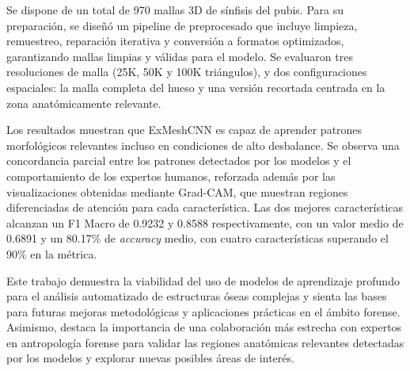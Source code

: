 Se dispone de un total de 970 mallas 3D de sínfisis del pubis. Para su preparación, se diseñó un pipeline de preprocesado que incluye limpieza, remuestreo, reparación iterativa y conversión a formatos optimizados, garantizando mallas limpias y válidas para el modelo. Se evaluaron tres resoluciones de malla (25K, 50K y 100K triángulos), y dos configuraciones espaciales: la malla completa del hueso y una versión recortada centrada en la zona anatómicamente relevante.

Los resultados muestran que ExMeshCNN es capaz de aprender patrones morfológicos relevantes incluso en condiciones de alto desbalance. Se observa una concordancia parcial entre los patrones detectados por los modelos y el comportamiento de los expertos humanos, reforzada además por las visualizaciones obtenidas mediante Grad-CAM, que muestran regiones diferenciadas de atención para cada característica. Las dos mejores características alcanzan un F1 Macro de 0.9232 y 0.8588 respectivamente, con un valor medio de 0.6891 y un 80.17\% de \textit{accuracy} medio, con cuatro características superando el 90\% en la métrica.

Este trabajo demuestra la viabilidad del uso de modelos de aprendizaje profundo para el análisis automatizado de estructuras óseas complejas y sienta las bases para futuras mejoras metodológicas y aplicaciones prácticas en el ámbito forense. Asimismo, destaca la importancia de una colaboración más estrecha con expertos en antropología forense para validar las regiones anatómicas relevantes detectadas por los modelos y explorar nuevas posibles áreas de interés.

\newpage
\thispagestyle{empty}


\begin{center}
{\large\bfseries \myTitleENG} \\
\end{center}
\begin{center}
\myName \\
\end{center}

\vspace{0.7cm}
 \\

\vspace{0.7cm}
 \\

